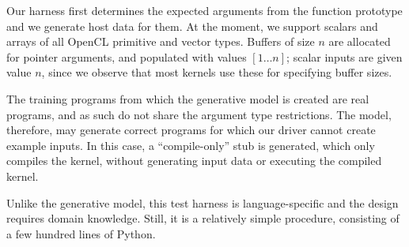 
Our harness first determines the expected arguments from the function prototype and we generate host data for them. At the moment, we support scalars and arrays of all OpenCL primitive and vector types. Buffers of size $n$ are allocated for pointer arguments, and populated with values {$[1 \ldots n]$}; scalar inputs are given value $n$, since we observe that most kernels use these for specifying buffer sizes. 

The training programs from which the generative model is created are real programs, and as such do not share the argument type restrictions. The model, therefore, may generate correct programs for which our driver cannot create example inputs. In this case, a ``compile-only'' stub is generated, which only compiles the kernel, without generating input data or executing the compiled kernel. 

Unlike the generative model, this test harness is language-specific and the design requires domain knowledge. Still, it is a relatively simple procedure, consisting of a few hundred lines of Python.



